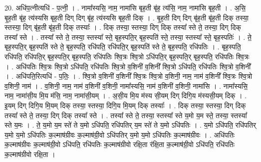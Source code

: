 \documentclass[17pt]{extarticle}
\begin{document}
20. अधि॑प॒त्नीत्यधि॑ - प॒त्नी॒ । . नामा᳚स्यसि॒ नाम॒ नामा॑सि बृह॒ती बृ॑ह॒ त्य॑सि॒ नाम॒ नामा॑सि बृह॒ती । . अ॒सि॒ बृ॒ह॒ती बृ॑ह॒ त्य॑स्यसि बृह॒ती दिग् दिग् बृ॑ह॒ त्य॑स्यसि बृह॒ती दिक् । . बृ॒ह॒ती दिग् दिग् बृ॑ह॒ती बृ॑ह॒ती दिक् तस्या॒ स्तस्या॒ दिग् बृ॑ह॒ती बृ॑ह॒ती दिक् तस्याः᳚ । . दिक् तस्या॒ स्तस्या॒ दिग् दिक् तस्या᳚ स्ते ते॒ तस्या॒ दिग् दिक् तस्या᳚ स्ते । . तस्या᳚ स्ते ते॒ तस्या॒ स्तस्या᳚ स्ते॒ बृह॒स्पति॒र् बृह॒स्पति॑ स्ते॒ तस्या॒ स्तस्या᳚ स्ते॒ बृह॒स्पतिः॑ । . ते॒ बृह॒स्पति॒र् बृह॒स्पति॑ स्ते ते॒ बृह॒स्पति॒ रधि॑पति॒ रधि॑पति॒र् बृह॒स्पति॑ स्ते ते॒ बृह॒स्पति॒ रधि॑पतिः । . बृह॒स्पति॒ रधि॑पति॒ रधि॑पति॒र् बृह॒स्पति॒र् बृह॒स्पति॒ रधि॑पतिः श्वि॒त्रः श्वि॒त्रो ऽधि॑पति॒र् बृह॒स्पति॒र् बृह॒स्पति॒ रधि॑पतिः श्वि॒त्रः । . अधि॑पतिः श्वि॒त्रः श्वि॒त्रो ऽधि॑पति॒ रधि॑पतिः श्वि॒त्रो व॒शिनी॑ व॒शिनी᳚ श्वि॒त्रो ऽधि॑पति॒ रधि॑पतिः श्वि॒त्रो व॒शिनी᳚ । . अधि॑पति॒रित्यधि॑ - प॒तिः॒ । . श्वि॒त्रो व॒शिनी॑ व॒शिनी᳚ श्वि॒त्रः श्वि॒त्रो व॒शिनी॒ नाम॒ नाम॑ व॒शिनी᳚ श्वि॒त्रः श्वि॒त्रो व॒शिनी॒ नाम॑ । . व॒शिनी॒ नाम॒ नाम॑ व॒शिनी॑ व॒शिनी॒ नामा᳚स्यसि॒ नाम॑ व॒शिनी॑ व॒शिनी॒ नामा॑सि । . नामा᳚स्यसि॒ नाम॒ नामा॑सी॒य मि॒य म॑सि॒ नाम॒ नामा॑सी॒यम् । . अ॒सी॒य मि॒य म॑स्य सी॒यम् दिग् दिगि॒य म॑स्यसी॒यम् दिक् । . इ॒यम् दिग् दिगि॒य मि॒यम् दिक् तस्या॒ स्तस्या॒ दिगि॒य मि॒यम् दिक् तस्याः᳚ । . दिक् तस्या॒ स्तस्या॒ दिग् दिक् तस्या᳚ स्ते ते॒ तस्या॒ दिग् दिक् तस्या᳚ स्ते । . तस्या᳚ स्ते ते॒ तस्या॒ स्तस्या᳚ स्ते य॒मो य॒म स्ते॒ तस्या॒ स्तस्या᳚ स्ते य॒मः । . ते॒ य॒मो य॒म स्ते॑ ते य॒मो ऽधि॑पति॒ रधि॑पतिर् य॒म स्ते॑ ते य॒मो ऽधि॑पतिः । . य॒मो ऽधि॑पति॒ रधि॑पतिर् य॒मो य॒मो ऽधि॑पतिः क॒ल्माष॑ग्रीवः क॒ल्माष॑ग्री॒वो ऽधि॑पतिर् य॒मो य॒मो ऽधि॑पतिः क॒ल्माष॑ग्रीवः । . अधि॑पतिः क॒ल्माष॑ग्रीवः क॒ल्माष॑ग्री॒वो ऽधि॑पति॒ रधि॑पतिः क॒ल्माष॑ग्रीवो रक्षि॒ता र॑क्षि॒ता क॒ल्माष॑ग्री॒वो ऽधि॑पति॒ रधि॑पतिः क॒ल्माष॑ग्रीवो रक्षि॒ता । \newline
\end{document}
